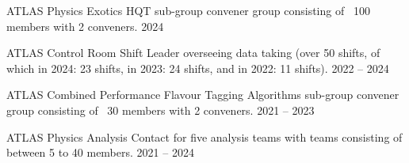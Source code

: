 


\begin{cvhonors}

  \cvhonor
    {ATLAS Physics Exotics HQT sub-group convener} %
    {group consisting of ~100 members with 2 conveners.} %
    {} %
    {2024} %

  \cvhonor
    {ATLAS Control Room Shift Leader} %
    {overseeing data taking (over 50 shifts, of which in 2024: 23 shifts, in 2023: 24 shifts, and in 2022: 11 shifts).} %
    {} %
    {2022 -- 2024} %

  \cvhonor
    {ATLAS Combined Performance Flavour Tagging Algorithms
    sub-group convener} %
    {group consisting of ~30 members with 2 conveners.} %
    {} %
    {2021 -- 2023} %

  \cvhonor
    {ATLAS Physics Analysis Contact} %
    {for five analysis teams with teams consisting of between 5 to 40 members.} %
    {} %
    {2021 -- 2024} %

\end{cvhonors}


